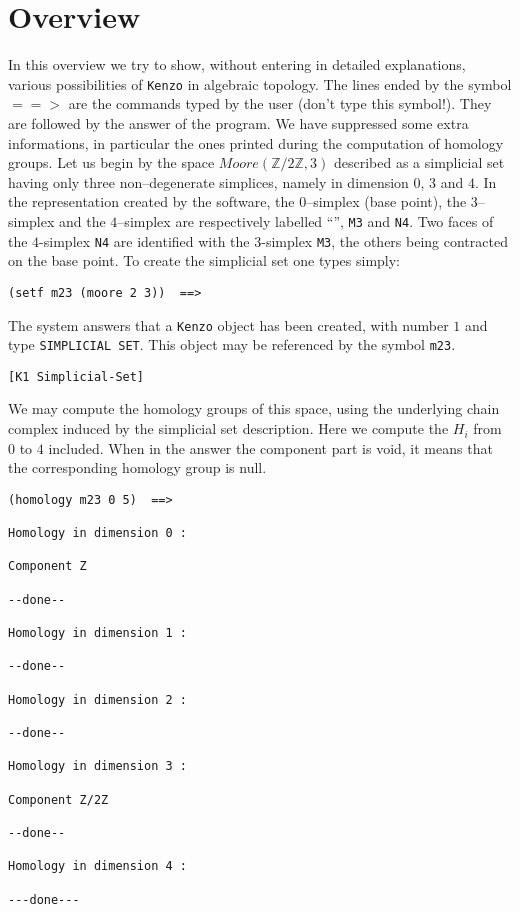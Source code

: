 \setcounter{chapter}{-1}
\chapter {Overview}

In this overview we try to  show, without entering in detailed
explanations, various possibilities of {\tt Kenzo} in algebraic topology.
The lines ended by the symbol $==>$ are the commands typed by the user 
(don't type this symbol!).
They are followed by the answer of the program. We have suppressed some
extra informations, in particular the ones printed during the computation
of homology groups.
\vskip 0.5cm
Let us begin by the space $Moore(\mathbb{Z}/2\mathbb{Z}, 3)$ described as a simplicial set
having only three non--degenerate simplices, namely in dimension
$0$, $3$ and $4$. In the  representation created by the software, the $0$--simplex (base point),
the $3$--simplex and the $4$--simplex are respectively labelled
``{\tt *}'', {\tt M3} and {\tt N4}. Two faces of the $4$-simplex {\tt N4} are identified with the
$3$-simplex {\tt M3}, the others being contracted on the base point. To create the simplicial set
one types simply:
{\footnotesize\begin{verbatim}
(setf m23 (moore 2 3))  ==>
\end{verbatim}}
The system answers that a {\tt Kenzo} object has been created, with number $1$ and
type {\tt SIMPLICIAL SET}. This object may be referenced  by the symbol {\tt m23}.
{\footnotesize\begin{verbatim}
[K1 Simplicial-Set]
\end{verbatim}}
We may compute the homology groups of this space, using the underlying chain complex
induced by the simplicial set description. Here we compute the $ H_i$ from $0$ to $4$ included.
When in the answer the component part is void, it means that the corresponding homology group is null.
{\footnotesize\begin{verbatim}
(homology m23 0 5)  ==>

Homology in dimension 0 :

Component Z

--done--

Homology in dimension 1 :

--done--

Homology in dimension 2 :

--done--

Homology in dimension 3 :

Component Z/2Z

--done--

Homology in dimension 4 :

---done---
\end{verbatim}}
